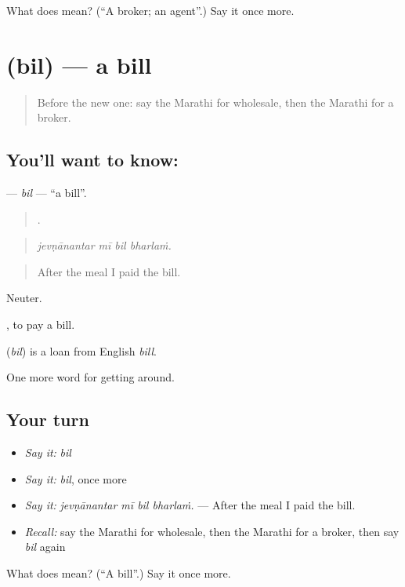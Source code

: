 \begin{tcolorbox}[breakable,colback=teal!4,colframe=teal!35!black,title={Before you move on}]
What does  mean? (\textquotedblleft{}A broker; an agent\textquotedblright{}.) Say it once more.
\end{tcolorbox}
\section[\texorpdfstring{\mr{बिल} (bil)}{बिल (bil)}]{ (bil) — a bill}

\label{lesson:MR-C424-bil}



\begin{quote}
Before the new one: say the Marathi for wholesale, then the Marathi for a broker.
\end{quote}

\subsection*{You'll want to know: }
\textbf{} — \emph{bil} — \textquotedblleft{}a bill\textquotedblright{}.

\begin{quote}
   .
\end{quote}

\begin{quote}
\emph{jevṇānantar mī bil bharlaṁ.}
\end{quote}

\begin{quote}
After the meal I paid the bill.
\end{quote}

Neuter.

 , to pay a bill.

\begin{cousinweb}
\textbf{} (\emph{bil}) is a loan from English \emph{bill}.
\end{cousinweb}

\begin{grammarlens}[title={What you've built}]
One more word for getting around.
\end{grammarlens}

\subsection*{Your turn}
\begin{itemize}
\raggedright
  \item \emph{Say it:} \emph{bil}
  \item \emph{Say it:} \emph{bil}, once more
  \item \emph{Say it:} \emph{jevṇānantar mī bil bharlaṁ.} — After the meal I paid the bill.
  \item \emph{Recall:} say the Marathi for wholesale, then the Marathi for a broker, then say \emph{bil} again
\end{itemize}

\begin{tcolorbox}[breakable,colback=teal!4,colframe=teal!35!black,title={Before you move on}]
What does  mean? (\textquotedblleft{}A bill\textquotedblright{}.) Say it once more.
\end{tcolorbox}
